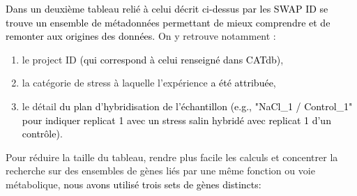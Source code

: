 \documentclass[twoside]{article}
\newcommand{\AR}[1]{\textcolor{black}{#1}}
\begin{document}
    
    \AR{Dans un deuxième tableau relié à celui décrit ci-dessus par les SWAP ID se trouve un ensemble de métadonnées permettant de mieux comprendre et de remonter aux origines des données.}
   On y retrouve notamment : 
   \begin{enumerate}
       \item le project ID \AR{(qui correspond à celui renseigné dans CATdb)},
       \item la catégorie de stress à laquelle l'expérience \AR{a été attribuée},
       \item le détail \AR{du plan d'hybridisation de l'échantillon (e.g., "NaCl\_1 / Control\_1" pour indiquer replicat 1 avec un stress salin hybridé avec replicat 1 d'un  contrôle)}.
   \end{enumerate} 
   
   \vspace{0.1cm}Pour réduire la taille du tableau, rendre plus facile les calculs et concentrer la recherche sur des ensembles de gènes liés par une même fonction ou voie métabolique, \AR{nous avons utilisé trois sets de gènes distincts:}
   
\end{document}
